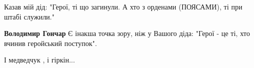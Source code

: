 \begin{itemize}
Казав мій дід: "Герої, ті що загинули. А хто з орденами (ПОЯСАМИ), ті при штабі служили."

\begin{itemize} %
\textbf{Володимир Гончар} Є інакша точка зору, ніж у Вашого діда:
"Герої - це ті, хто вчинив геройський поступок".
\end{itemize} %

І медведчук , і гіркін...


\end{itemize} %
